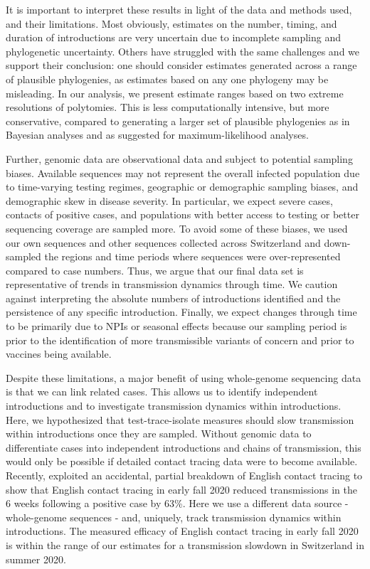 \documentclass[11pt,twoside,lineno]{pnas-new} %
\begin{document}
It is important to interpret these results in light of the data and methods used, and their limitations. Most obviously, estimates on the number, timing, and duration of introductions are very uncertain due to incomplete sampling and phylogenetic uncertainty. Others have struggled with the same challenges \cite{Morel2021} and we support their conclusion: one should consider estimates generated across a range of plausible phylogenies, as estimates based on any one phylogeny may be misleading. In our analysis, we present estimate ranges based on two extreme resolutions of polytomies. This is less computationally intensive, but more conservative, compared to generating a larger set of plausible phylogenies as in Bayesian analyses and as \cite{Morel2021} suggested for maximum-likelihood analyses.

Further, genomic data are observational data and subject to potential sampling biases. Available sequences may not represent the overall infected population due to time-varying testing regimes, geographic or demographic sampling biases, and demographic skew in disease severity. In particular, we expect severe cases, contacts of positive cases, and populations with better access to testing or better sequencing coverage are sampled more. To avoid some of these biases, we used our own sequences and other sequences collected across Switzerland and down-sampled the regions and time periods where sequences were over-represented compared to case numbers. Thus, we argue that our final data set is representative of trends in transmission dynamics through time. We caution against interpreting the absolute numbers of introductions identified and the persistence of any specific introduction. Finally, we expect changes through time to be primarily due to NPIs or seasonal effects because our sampling period is prior to the identification of more transmissible variants of concern and prior to vaccines being available. 

Despite these limitations, a major benefit of using whole-genome sequencing data is that we can link related cases. This allows us to identify independent introductions and to investigate transmission dynamics within introductions. Here, we hypothesized that test-trace-isolate measures should slow transmission within introductions once they are sampled. Without genomic data to differentiate cases into independent introductions and chains of transmission, this would only be possible if detailed contact tracing data were to become available. Recently, \cite{Fetzer2021} exploited an accidental, partial breakdown of English contact tracing to show that English contact tracing in early fall 2020 reduced transmissions in the 6 weeks following a positive case by 63\%. Here we use a different data source - whole-genome sequences - and, uniquely, track transmission dynamics within introductions. The measured efficacy of English contact tracing in early fall 2020 is within the range of our estimates for a transmission slowdown in Switzerland in summer 2020.
\end{document}
